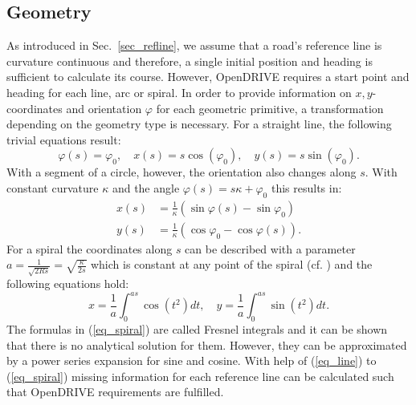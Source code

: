 \documentclass[a4paper, 10pt, conference]{ieeeconf}      %
\begin{document}
\subsection{Geometry}\label{sec_geometry}
	As introduced in Sec.~\ref{sec_refline}, we assume that a road's reference line is curvature continuous and therefore, a single initial position and heading is sufficient to calculate its course. However, OpenDRIVE requires a start point and heading for each line, arc or spiral. In order to provide information on $x,y$-coordinates and orientation $\varphi$ for each geometric primitive, a transformation depending on the geometry type is necessary. For a straight line, the following trivial equations result:
    \begin{equation}
        \varphi(s) = \varphi_0, \quad x(s) = s \cos(\varphi_0), \quad y(s) = s \sin(\varphi_0) \text{.}
        \label{eq_line}
    \end{equation}
    With a segment of a circle, however, the orientation also changes along $s$. With constant curvature $\kappa$ and the angle $\varphi(s) = s \kappa + \varphi_0$ this results in:
    \begin{equation}
    \begin{split}
        x(s) &= \frac{1}{\kappa} \left(\sin\varphi(s) - \sin\varphi_0 \right)\\
        y(s) &= \frac{1}{\kappa} \left(\cos\varphi_0 - \cos\varphi(s) \right) \text{.}
    \end{split}
    \label{eq_arc}
    \end{equation}
    For a spiral the coordinates along $s$ can be described with a parameter \(a = \frac{1}{\sqrt{2Rs}} = \sqrt{\frac{\kappa}{2s}}\) which is constant at any point of the spiral (cf. \cite{Baier.2008}) and the following equations hold: 
    \begin{equation} 
        x = \frac{1}{a}\int_0^{as}  \cos\left(t^2\right)dt, \quad y = \frac{1}{a}\int_0^{as}  \sin\left(t^2\right)dt \text{.}
        \label{eq_spiral}
    \end{equation}
	The formulas in (\ref{eq_spiral}) are called Fresnel integrals and it can be shown that there is no analytical solution for them. However, they can be approximated by a power series expansion for sine and cosine. With help of (\ref{eq_line}) to (\ref{eq_spiral}) missing information for each reference line can be calculated such that OpenDRIVE requirements are fulfilled.
\end{document}
